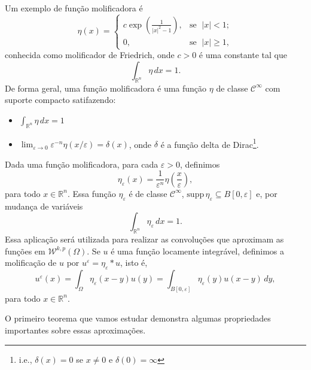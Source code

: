 \documentclass[a4paper, 11pt]{book}
\theoremstyle{definition}
\newcommand{\bR}{\mathbb{R}}
\newcommand{\cC}{\mathcal{C}}
\newcommand{\cW}{\mathcal{W}}
\newcommand{\supp}{\mathrm{supp}\,}
\begin{document}
Um exemplo de função molificadora é
\begin{equation} \label{eq:molificador-friedrich}
    \eta(x) =
    \left\{
        \begin{array}{lr}
            c \exp \left( \frac{1}{|x|^2 - 1} \right), &\! \text{se }\; |x| < 1;\\
            0, &\!\text{se }\; |x| \geqslant 1,
        \end{array}
    \right.
\end{equation}
conhecida como molificador de Friedrich, onde $c > 0$ é uma constante tal que
\[
    \int_{\bR^n} \eta \,dx = 1.
\]
De forma geral, uma função molificadora é uma função $\eta$ de classe $\cC^\infty$ com suporte compacto satifazendo:
\begin{itemize}[leftmargin=*, label=\small{$\bullet$}]
    \item $\displaystyle \int_{\bR^n} \eta \,dx = 1$
    \item $\displaystyle \lim_{\varepsilon \to 0} \varepsilon^{-n}\eta(x/\varepsilon) = \delta(x)$, onde $\delta$ é a função delta de Dirac\footnote{i.e., $\delta(x) = 0$ se $x \neq 0$ e $\delta(0) = \infty$}.
\end{itemize}
Dada uma função molificadora, para cada $\varepsilon > 0$, definimos
\begin{equation} \label{eq:eta-epsilon}
    \eta_\varepsilon(x) = \frac{1}{\varepsilon^n} \eta\left( \frac{x}{\varepsilon} \right), 
\end{equation}
para todo $x \in \bR^n$. Essa função $\eta_\varepsilon$ é de classe $\cC^\infty$, $\supp \eta_\varepsilon \subseteq B[0,\varepsilon]$ e, por mudança de variáveis
\begin{equation} \label{eq:integral1}
    \int_{\bR^n} \eta_\varepsilon \,dx = 1.
\end{equation}
Essa aplicação será utilizada para realizar as convoluções que aproximam as funções em $\cW^{k,p}(\Omega)$. Se $u$ é uma função locamente integrável, definimos a molificação de $u$ por $u^\varepsilon = \eta_\varepsilon * u$, isto é,
\[
    u^\varepsilon(x) = \int_\Omega \eta_\varepsilon(x-y) u(y) = \int_{B[0,\varepsilon]} \eta_\varepsilon(y) u(x-y) \,dy,
\]
para todo $x \in \bR^n$.

O primeiro teorema que vamos estudar demonstra algumas propriedades importantes sobre essas aproximações.
\end{document}

